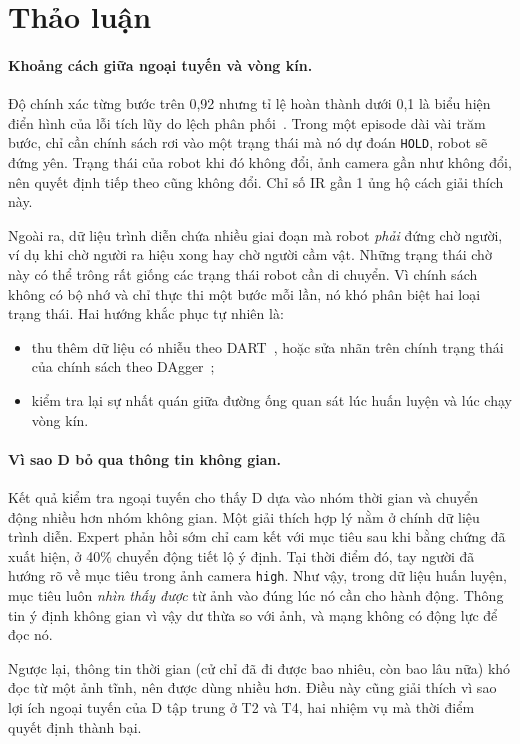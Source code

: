 \section{Thảo luận}
\label{sec:discussion}

\paragraph{Khoảng cách giữa ngoại tuyến và vòng kín.} Độ chính xác từng bước trên 0,92 nhưng tỉ lệ hoàn thành dưới 0,1 là biểu hiện điển hình của lỗi tích lũy do lệch phân phối~\cite{ross2011dagger}. Trong một episode dài vài trăm bước, chỉ cần chính sách rơi vào một trạng thái mà nó dự đoán \texttt{HOLD}, robot sẽ đứng yên. Trạng thái của robot khi đó không đổi, ảnh camera gần như không đổi, nên quyết định tiếp theo cũng không đổi. Chỉ số IR gần 1 ủng hộ cách giải thích này.

Ngoài ra, dữ liệu trình diễn chứa nhiều giai đoạn mà robot \emph{phải} đứng chờ người, ví dụ khi chờ người ra hiệu xong hay chờ người cầm vật. Những trạng thái chờ này có thể trông rất giống các trạng thái robot cần di chuyển. Vì chính sách không có bộ nhớ và chỉ thực thi một bước mỗi lần, nó khó phân biệt hai loại trạng thái. Hai hướng khắc phục tự nhiên là:
\begin{itemize}
  \item thu thêm dữ liệu có nhiễu theo DART~\cite{laskey2017dart}, hoặc sửa nhãn trên chính trạng thái của chính sách theo DAgger~\cite{ross2011dagger};
  \item kiểm tra lại sự nhất quán giữa đường ống quan sát lúc huấn luyện và lúc chạy vòng kín.
\end{itemize}

\paragraph{Vì sao D bỏ qua thông tin không gian.} Kết quả kiểm tra ngoại tuyến cho thấy D dựa vào nhóm thời gian và chuyển động nhiều hơn nhóm không gian. Một giải thích hợp lý nằm ở chính dữ liệu trình diễn. Expert phản hồi sớm chỉ cam kết với mục tiêu sau khi bằng chứng đã xuất hiện, ở 40\% chuyển động tiết lộ ý định. Tại thời điểm đó, tay người đã hướng rõ về mục tiêu trong ảnh camera \texttt{high}. Như vậy, trong dữ liệu huấn luyện, mục tiêu luôn \emph{nhìn thấy được} từ ảnh vào đúng lúc nó cần cho hành động. Thông tin ý định không gian vì vậy dư thừa so với ảnh, và mạng không có động lực để đọc nó.

Ngược lại, thông tin thời gian (cử chỉ đã đi được bao nhiêu, còn bao lâu nữa) khó đọc từ một ảnh tĩnh, nên được dùng nhiều hơn. Điều này cũng giải thích vì sao lợi ích ngoại tuyến của D tập trung ở T2 và T4, hai nhiệm vụ mà thời điểm quyết định thành bại.

